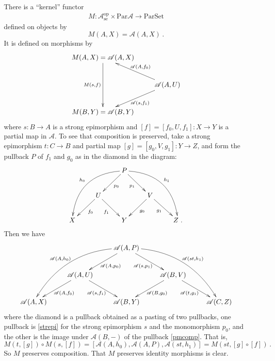 \documentclass[a4paper,12pt,reqno]{amsart}
\theoremstyle{definition}
\theoremstyle{fact}
\theoremstyle{genquest}
\theoremstyle{step}
\newcommand{\lra}{\longrightarrow}
\def\CA{{\mathscr A}}
\begin{document}
There is a ``kernel'' functor 
\begin{eqnarray}\label{em}
M : \CA_{\mathrm{se}}^{\mathrm{op}} \times \mathrm{Par}\CA \lra \mathrm{Par}\mathrm{Set}
\end{eqnarray}
defined on objects by 
$$M(A,X) = \CA(A,X) \ .$$
It is defined on morphisms by
\begin{eqnarray}\label{strepi}
\begin{aligned}
\xymatrix{
M(A,X)=\CA(A,X) \ar[dd]_-{M(s,f)} \\
& \CA(A,U) \ar[lu]_-{\CA(A,f_0)} \ar[ld]^-{\CA(s,f_1)} \\
M(B,Y)=\CA(B,Y)}
\end{aligned}
\end{eqnarray}
where $s:B\lra A$ is a strong epimorphism and $[f] = [f_0,U,f_1]:X\lra Y$ 
is a partial map in $\CA$. To see that composition is preserved, take a
strong epimorphism $t:C\lra B$ and partial map $[g]=[g_0,V,g_1]:Y\lra Z$,
and form the pullback $P$ of $f_1$ and $g_0$ as in the diamond in the diagram: 
\begin{equation}\label{pmcomp}
\begin{aligned}
\xymatrix{
& & P \ar[ld]^-{p_0} \ar@/_2pc/[lldd]_-{h_0} \ar[rd]_-{p_1} \ar@/^2pc/[rrdd]^-{h_1} \\
& U \ar[ld]^-{f_0} \ar[rd]_-{f_1} & & V \ar[rd]_-{g_1} \ar[ld]^-{g_0} \\
X & & Y & & Z \ .}
\end{aligned}
\end{equation}
Then we have
\begin{equation}\label{Mcomp}
\begin{aligned}
\xymatrix{
& & \CA(A,P) \ar[ld]^-{\CA(A,p_0)} \ar@/_2pc/[lldd]_-{\CA(A,h_0)} \ar[rd]_-{\CA(s,p_1)} \ar@/^2pc/[rrdd]^-{\CA(st,h_1)} \\
& \CA(A,U) \ar[ld]^-{\CA(A,f_0)} \ar[rd]_-{\CA(s,f_1)} & & \CA(B,V) \ar[rd]_-{\CA(t,g_1)} \ar[ld]^-{\CA(B,g_0)} \\
\CA(A,X) & & \CA(B,Y) & & \CA(C,Z)}
\end{aligned}
\end{equation}
where the diamond is a pullback obtained as a pasting of two pullbacks, 
one pullback is \eqref{strepi} for the strong epimorphism $s$ and 
the monomorphism $p_0$, and the other is the image under $\CA(B,-)$ 
of the pullback \eqref{pmcomp}. 
That is,
$$M(t,[g])\circ M(s,[f])=[\CA(A,h_0),\CA(A,P),\CA(st,h_1)]=M(st,[g]\circ[f]) \ .$$
So $M$ preserves composition. That $M$ preserves identity morphisms is clear.
\end{document}
